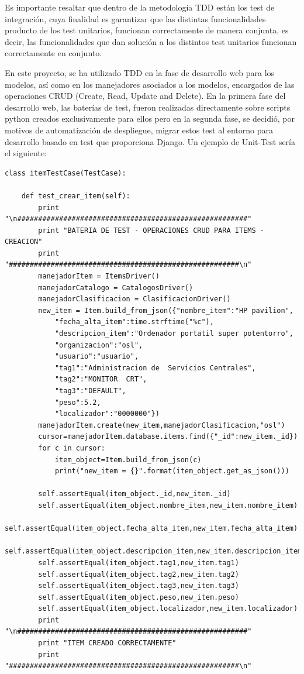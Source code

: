 \documentclass[a4paper,11pt]{book}
\begin{document}
	 

Es importante resaltar que dentro de la metodología TDD están los test de integración, cuya finalidad es garantizar que las distintas funcionalidades producto de los test unitarios, funcionan correctamente de manera conjunta, es decir, las funcionalidades que dan solución a los  distintos test unitarios funcionan correctamente en conjunto. 


En este proyecto, se ha utilizado TDD en la fase de desarrollo web para los modelos, así como en los manejadores asociados a los modelos, encargados de las operaciones CRUD (Create, Read, Update and Delete). En la primera fase del desarrollo web, las baterías de test, fueron realizadas directamente sobre scripts python creados exclusivamente para ellos pero en la segunda fase, se decidió, por motivos de automatización de despliegue,  migrar estos test al entorno para desarrollo basado en test que proporciona Django. Un ejemplo de Unit-Test sería el siguiente:
\begin{lstlisting}
class itemTestCase(TestCase):

    def test_crear_item(self):
        print "\n#######################################################"
        print "BATERIA DE TEST - OPERACIONES CRUD PARA ITEMS - CREACION"
        print "#######################################################\n"
        manejadorItem = ItemsDriver()
        manejadorCatalogo = CatalogosDriver()
        manejadorClasificacion = ClasificacionDriver()
        new_item = Item.build_from_json({"nombre_item":"HP pavilion",
            "fecha_alta_item":time.strftime("%c"),
            "descripcion_item":"Ordenador portatil super potentorro",
            "organizacion":"osl",
            "usuario":"usuario",
            "tag1":"Administracion de  Servicios Centrales",
            "tag2":"MONITOR  CRT",
            "tag3":"DEFAULT",
            "peso":5.2,
            "localizador":"0000000"})
        manejadorItem.create(new_item,manejadorClasificacion,"osl")
        cursor=manejadorItem.database.items.find({"_id":new_item._id})
        for c in cursor:
            item_object=Item.build_from_json(c)
            print("new_item = {}".format(item_object.get_as_json()))

        self.assertEqual(item_object._id,new_item._id)
        self.assertEqual(item_object.nombre_item,new_item.nombre_item)
        self.assertEqual(item_object.fecha_alta_item,new_item.fecha_alta_item)
        self.assertEqual(item_object.descripcion_item,new_item.descripcion_item)
        self.assertEqual(item_object.tag1,new_item.tag1)
        self.assertEqual(item_object.tag2,new_item.tag2)
        self.assertEqual(item_object.tag3,new_item.tag3)
        self.assertEqual(item_object.peso,new_item.peso)
        self.assertEqual(item_object.localizador,new_item.localizador)
        print "\n#######################################################"
        print "ITEM CREADO CORRECTAMENTE"
        print "#######################################################\n"
\end{lstlisting}
\end{document}

